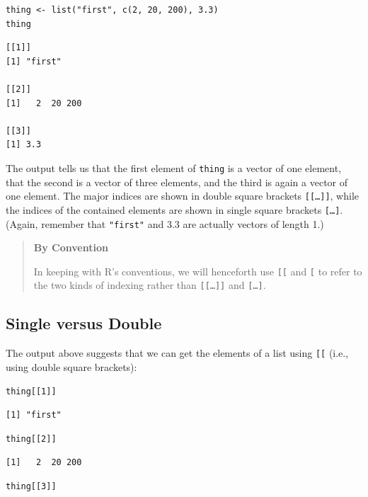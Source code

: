 \begin{lstlisting}
thing <- list("first", c(2, 20, 200), 3.3)
thing
\end{lstlisting}

\begin{lstlisting}
[[1]]
[1] "first"

[[2]]
[1]   2  20 200

[[3]]
[1] 3.3
\end{lstlisting}

The output tells us that the first element of \texttt{thing} is a vector of one element,
that the second is a vector of three elements,
and the third is again a vector of one element.
The major indices are shown in double square brackets \texttt{[[\ldots{}]]},
while the indices of the contained elements are shown in single square brackets \texttt{[\ldots{}]}.
(Again,
remember that \texttt{"first"} and 3.3 are actually vectors of length 1.)

\begin{quote}
\textbf{By Convention}

In keeping with R's conventions,
we will henceforth use \texttt{[[} and \texttt[ to refer to the two kinds of indexing
rather than \texttt{[[\ldots{}]]} and \texttt{[\ldots{}]}.
\end{quote}

\subsection{Single versus Double}

The output above suggests that
we can get the elements of a list using \texttt{[[}
(i.e., using double square brackets):

\begin{lstlisting}
thing[[1]]
\end{lstlisting}

\begin{lstlisting}
[1] "first"
\end{lstlisting}

\begin{lstlisting}
thing[[2]]
\end{lstlisting}

\begin{lstlisting}
[1]   2  20 200
\end{lstlisting}

\begin{lstlisting}
thing[[3]]
\end{lstlisting}

